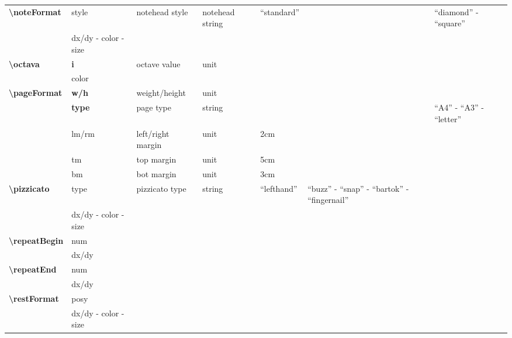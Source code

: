 \documentclass[a4paper, landscape, 10pt]{article}
\begin{document}
\begin{tabularx}{\linewidth}{p{3cm}p{3cm}p{5cm}p{3cm}p{2.5cm}p{3.5cm}p{4cm}}
    \hline
    \textbf{\textbackslash{}noteFormat}&style&notehead style&notehead string&``standard''&&``diamond'' - ``square''\\
	&dx/dy - color - size&&&&&\\
    \hline
    \textbf{\textbackslash{}octava}&\textbf{i}&octave value&unit&&&\\
    &color&&&&&\\
    \hline
    \textbf{\textbackslash{}pageFormat}&\textbf{w/h}&weight/height&unit&&&\\
    &\textbf{type}&page type&string&&&``A4'' - ``A3'' - ``letter''\\
    &lm/rm&left/right margin&unit&2cm&&\\
    &tm&top margin&unit&5cm&&\\
    &bm&bot margin&unit&3cm&&\\
    \hline
    \textbf{\textbackslash{}pizzicato}&type&pizzicato type&string&``lefthand''&``buzz'' - ``snap'' - ``bartok'' - ``fingernail''&\\
    &dx/dy - color - size&&&&&\\
    \hline
    \textbf{\textbackslash{}repeatBegin}&num&&&&&\\ %
    &dx/dy&&&&&\\
    \hline
    \textbf{\textbackslash{}repeatEnd}&num&&&&&\\ %
    &dx/dy&&&&&\\
    \hline
    \textbf{\textbackslash{}restFormat}&posy&&&&&\\ %
    &dx/dy - color - size&&&&&\\
    \hline
\end{tabularx}
\end{document}
